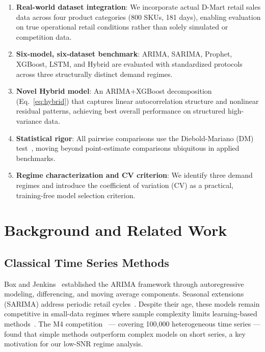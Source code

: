 \documentclass[journal]{IEEEtran}
\begin{document}
\begin{enumerate}
  \item \textbf{Real-world dataset integration}: We incorporate actual D-Mart retail sales data across four product categories (800 SKUs, 181 days), enabling evaluation on true operational retail conditions rather than solely simulated or competition data.
  \item \textbf{Six-model, six-dataset benchmark}: ARIMA, SARIMA, Prophet, XGBoost, LSTM, and Hybrid are evaluated with standardized protocols across three structurally distinct demand regimes.
  \item \textbf{Novel Hybrid model}: An ARIMA+XGBoost decomposition (Eq.~\ref{eq:hybrid}) that captures linear autocorrelation structure and nonlinear residual patterns, achieving best overall performance on structured high-variance data.
  \item \textbf{Statistical rigor}: All pairwise comparisons use the Diebold-Mariano (DM) test~\cite{diebold1995comparing}, moving beyond point-estimate comparisons ubiquitous in applied benchmarks.
  \item \textbf{Regime characterization and CV criterion}: We identify three demand regimes and introduce the coefficient of variation (CV) as a practical, training-free model selection criterion.
\end{enumerate}

\section{Background and Related Work}
\label{sec:related}

\subsection{Classical Time Series Methods}

Box and Jenkins~\cite{box2015time} established the ARIMA framework through autoregressive modeling, differencing, and moving average components. Seasonal extensions (SARIMA) address periodic retail cycles~\cite{hyndman2018forecasting}. Despite their age, these models remain competitive in small-data regimes where sample complexity limits learning-based methods~\cite{makridakis2018statistical}. The M4 competition~\cite{makridakis2018m4} — covering 100,000 heterogeneous time series — found that simple methods outperform complex models on short series, a key motivation for our low-SNR regime analysis.
\end{document}
